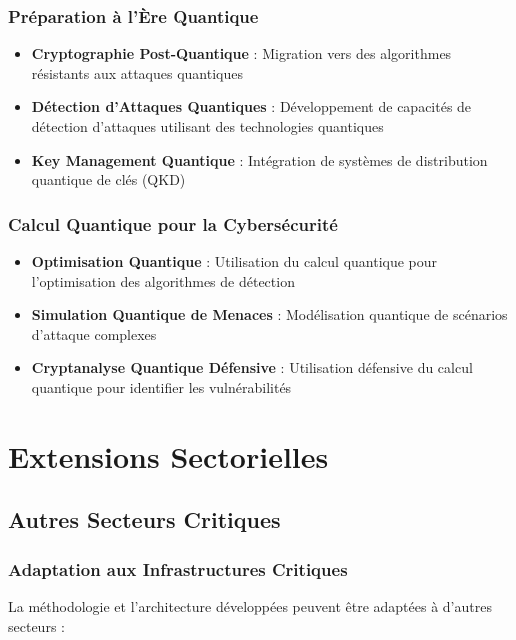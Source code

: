 \subsubsection{Préparation à l'Ère Quantique}

\begin{itemize}
    \item \textbf{Cryptographie Post-Quantique} : Migration vers des algorithmes résistants aux attaques quantiques
    \item \textbf{Détection d'Attaques Quantiques} : Développement de capacités de détection d'attaques utilisant des technologies quantiques
    \item \textbf{Key Management Quantique} : Intégration de systèmes de distribution quantique de clés (QKD)
\end{itemize}

\subsubsection{Calcul Quantique pour la Cybersécurité}

\begin{itemize}
    \item \textbf{Optimisation Quantique} : Utilisation du calcul quantique pour l'optimisation des algorithmes de détection
    \item \textbf{Simulation Quantique de Menaces} : Modélisation quantique de scénarios d'attaque complexes
    \item \textbf{Cryptanalyse Quantique Défensive} : Utilisation défensive du calcul quantique pour identifier les vulnérabilités
\end{itemize}

\section{Extensions Sectorielles}

\subsection{Autres Secteurs Critiques}

\subsubsection{Adaptation aux Infrastructures Critiques}

La méthodologie et l'architecture développées peuvent être adaptées à d'autres secteurs :

